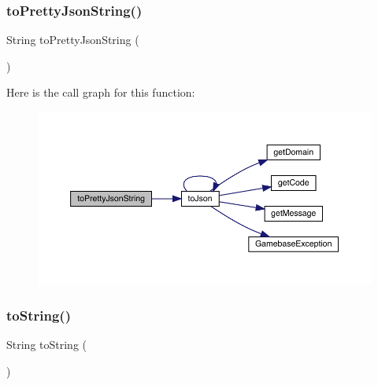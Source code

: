 \subsubsection{\texorpdfstring{to\+Pretty\+Json\+String()}{toPrettyJsonString()}}
{\footnotesize\ttfamily String to\+Pretty\+Json\+String (\begin{DoxyParamCaption}{ }\end{DoxyParamCaption})}

Here is the call graph for this function\+:
\nopagebreak
\begin{figure}[H]
\begin{center}
\leavevmode
\includegraphics[width=350pt]{classcom_1_1toast_1_1android_1_1gamebase_1_1base_1_1_gamebase_exception_a054431f3d988a22295cfc8b784ff2637_cgraph}
\end{center}
\end{figure}
\mbox{\label{classcom_1_1toast_1_1android_1_1gamebase_1_1base_1_1_gamebase_exception_ad146fa8579a5f8a876c4688cc5a68520}} 
\subsubsection{\texorpdfstring{to\+String()}{toString()}}
{\footnotesize\ttfamily String to\+String (\begin{DoxyParamCaption}{ }\end{DoxyParamCaption})}


